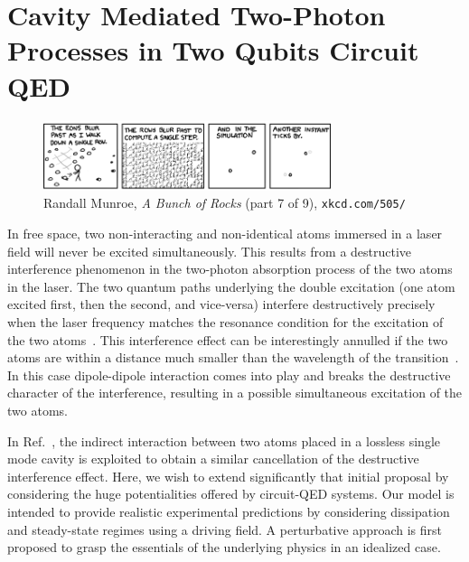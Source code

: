 


\chapter{Cavity Mediated Two-Photon Processes in Two Qubits Circuit QED} \label{ch-6}

\begin{figure}[h]
    \captionsetup{labelformat=empty}
     \includegraphics[width=0.75\textwidth]{Images/xkcd/xkcd7.png}
    \caption*{  Randall Munroe, \emph{A Bunch of Rocks} (part 7 of 9), \texttt{xkcd.com/505/} }
\end{figure}


In free space, two non-interacting and non-identical atoms immersed in a laser field will never be excited simultaneously. This results from a destructive interference phenomenon in the two-photon absorption process of the two atoms in the laser. The two quantum paths underlying the double excitation (one atom excited first, then the second, and vice-versa) interfere destructively precisely when the laser frequency matches the resonance condition for the excitation of the two atoms~\cite{Kim98}. This interference effect can be interestingly annulled if the two atoms are within a distance much smaller than the wavelength of the transition~\cite{Var92, Orr02, Het02}. In this case dipole-dipole interaction comes into play and breaks the destructive character of the interference, resulting in a possible simultaneous excitation of the two atoms.

In Ref.~\cite{Kim98}, the indirect interaction between two atoms placed in a lossless single mode cavity is exploited to obtain a similar cancellation of the destructive interference effect. Here, we wish to extend significantly that initial proposal by considering the huge potentialities offered by circuit-QED systems. Our model is intended to provide realistic experimental predictions by considering dissipation and steady-state regimes using a driving field. A perturbative approach is first proposed to grasp the essentials of the underlying physics in an idealized case.

